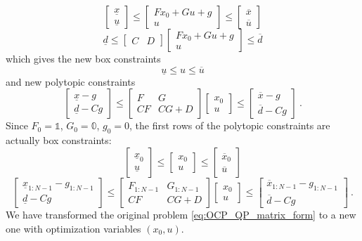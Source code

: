 \documentclass[a4paper]{article}
\newcommand{\I}{\mathbb{1}}
\newcommand{\ZeroMat}{\mathbb{0}}
\newcommand{\bbmat}{\begin{bmatrix}}
\newcommand{\ebmat}{\end{bmatrix}}
\begin{document}
\begin{equation}
	\bbmat \underline{x} \\ \underline{u} \ebmat
	\leq \bbmat F x_0 + G u + g \\ u \ebmat
	\leq \bbmat \overline{x} \\ \overline{u} \ebmat
\end{equation}
\begin{equation}
	\underline{d} \leq \bbmat C & D \ebmat\bbmat F x_0 + G u + g \\ u \ebmat \leq \overline{d}
\end{equation}
which gives the new box constraints
\begin{equation}
	\underline{u} \leq u \leq \overline{u}
\end{equation}
and new polytopic constraints
\begin{equation}	 
	\bbmat \underline{x} - g \\ \underline{d} - C g \ebmat
	\leq \bbmat F & G \\ C F & C G + D \ebmat \bbmat x_0 \\ u \ebmat 
	\leq \bbmat \overline{x} - g \\ \overline{d} - C g \ebmat \ .
\end{equation}
Since $F_0=\I$, $G_0=\ZeroMat$, $g_0=0$, the first rows of the polytopic constraints are actually box constraints:
\begin{equation}
	\bbmat \underline{x}_0 \\ \underline{u} \ebmat
	\leq \bbmat x_0 \\ u \ebmat 
	\leq \bbmat \overline{x}_0 \\ \overline{u} \ebmat
\end{equation}
\begin{equation}	 
	\bbmat \underline{x}_{1:N-1} - g_{1:N-1} \\ \underline{d} - C g \ebmat
	\leq \bbmat F_{1:N-1} & G_{1:N-1} \\ C F & C G + D \ebmat \bbmat x_0 \\ u \ebmat 
	\leq \bbmat \overline{x}_{1:N-1} - g_{1:N-1} \\ \overline{d} - C g \ebmat \ .
\end{equation}
We have transformed the original problem \eqref{eq:OCP_QP_matrix_form} to a new one with optimization variables $(x_0,u)$.

 
\end{document}
